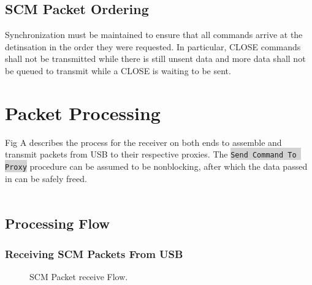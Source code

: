 \documentclass[10pt]{article}
\begin{document}
	\subsection{SCM Packet Ordering}
	Synchronization must be maintained to ensure that all commands arrive at the detinsation in the order they were requested. In particular, CLOSE commands shall not be transmitted while there is still unsent data and more data shall not be queued to transmit while a CLOSE is waiting to be sent. 
	
	\section{Packet Processing}
	Fig A describes the process for the receiver on both ends to assemble and transmit packets from USB to their respective proxies. The \colorbox{lightgray}{\lstinline{Send Command To Proxy}} procedure can be assumed to be nonblocking, after which the data passed in can be safely freed. \\
	\\	
	\subsection{Processing Flow}
	\subsubsection{Receiving SCM Packets From USB}
	\begin{figure}[H]
	\begin{center}
		\caption[SCM Packet receive Flow]{SCM Packet receive Flow.}
		
	\end{center}
	\end{figure}
	
\end{document}
